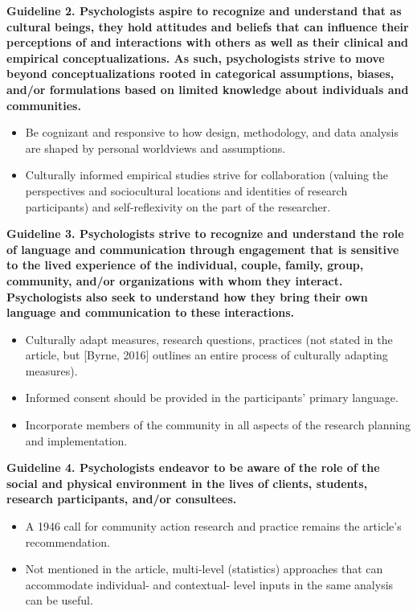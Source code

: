 \documentclass[
  english,
]{book}
\providecommand{\tightlist}{%
  \setlength{\itemsep}{0pt}\setlength{\parskip}{0pt}}
\begin{document}
\textbf{Guideline 2. Psychologists aspire to recognize and understand that as cultural beings, they hold attitudes and beliefs that can influence their perceptions of and interactions with others as well as their clinical and empirical conceptualizations. As such, psychologists strive to move beyond conceptualizations rooted in categorical assumptions, biases, and/or formulations based on limited knowledge about individuals and communities.}

\begin{itemize}
\tightlist
\item
  Be cognizant and responsive to how design, methodology, and data analysis are shaped by personal worldviews and assumptions.
\item
  Culturally informed empirical studies strive for collaboration (valuing the perspectives and sociocultural locations and identities of research participants) and self-reflexivity on the part of the researcher.
\end{itemize}

\textbf{Guideline 3. Psychologists strive to recognize and understand the role of language and communication through engagement that is sensitive to the lived experience of the individual, couple, family, group, community, and/or organizations with whom they interact. Psychologists also seek to understand how they bring their own language and communication to these interactions.}

\begin{itemize}
\tightlist
\item
  Culturally adapt measures, research questions, practices (not stated in the article, but {[}Byrne, 2016{]} outlines an entire process of culturally adapting measures).
\item
  Informed consent should be provided in the participants' primary language.
\item
  Incorporate members of the community in all aspects of the research planning and implementation.
\end{itemize}

\textbf{Guideline 4. Psychologists endeavor to be aware of the role of the social and physical environment in the lives of clients, students, research participants, and/or consultees.}

\begin{itemize}
\tightlist
\item
  A 1946 call for community action research and practice remains the article's recommendation.
\item
  Not mentioned in the article, multi-level (statistics) approaches that can accommodate individual- and contextual- level inputs in the same analysis can be useful.
\end{itemize}
\end{document}
